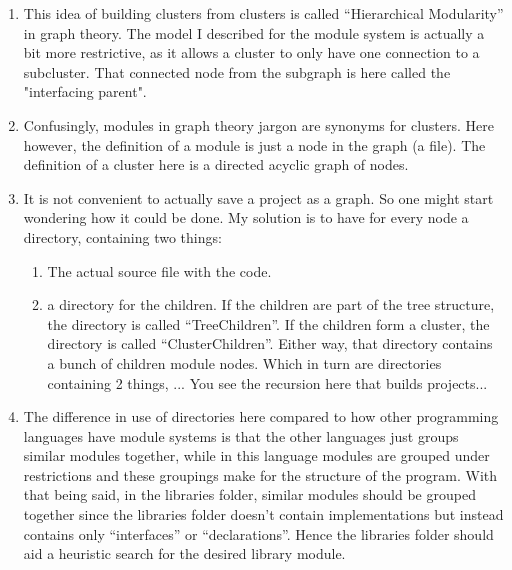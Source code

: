 \documentclass{article}
\begin{document}
\begin{enumerate}
    \item This idea of building clusters from clusters is called “Hierarchical Modularity” in graph theory. The model I described for the module system is actually a bit more restrictive, as it allows a cluster to only have one connection to a subcluster. That connected node from the subgraph is here called the "interfacing parent".

    \item Confusingly, modules in graph theory jargon are synonyms for clusters. Here however, the definition of a module is just a node in the graph (a file). The definition of a cluster here is a directed acyclic graph of nodes.
    
    \item It is not convenient to actually save a project as a graph. So one might start wondering how it could be done. My solution is to have for every node a directory, containing two things:
    
    \begin{enumerate}
        \item The actual source file with the code.

        \item a directory for the children. If the children are part of the tree structure, the directory is called “TreeChildren”. If the children form a cluster, the directory is called “ClusterChildren”. Either way, that directory contains a bunch of children module nodes. Which in turn are directories containing 2 things, ... You see the recursion here that builds projects...
    
    \end{enumerate}
    
    \item The difference in use of directories here compared to how other programming languages have module systems is that the other languages just groups similar modules together, while in this language modules are grouped under restrictions and these groupings make for the structure of the program. With that being said, in the libraries folder, similar modules should be grouped together since the libraries folder doesn’t contain implementations but instead contains only “interfaces” or “declarations”. Hence the libraries folder should aid a heuristic search for the desired library module.
    
\end{enumerate}
\end{document}
